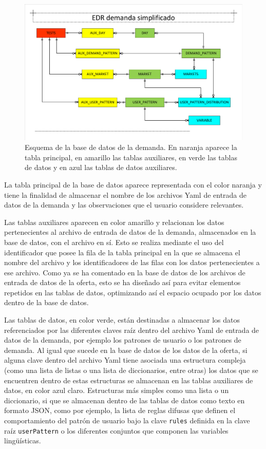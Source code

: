 \begin{figure}[H]
\centering
\includegraphics[width=.95\textwidth]{fig/Bases de datos/EDR demanda simplificado.pdf}
\caption{Esquema de la base de datos de la demanda. En naranja aparece la tabla principal, en amarillo las tablas auxiliares, en verde las tablas de datos y en azul las tablas de datos auxiliares.}
\label{fig:edrDemandaSimplificado}
\end{figure}

La tabla principal de la base de datos aparece representada con el color naranja y tiene la finalidad de almacenar el nombre de los archivos \acrshort{Yaml} de entrada de datos de la demanda y las observaciones que el usuario considere relevantes.

Las tablas auxiliares aparecen en color amarillo y relacionan los datos pertenecientes al archivo de entrada de datos de la demanda, almacenados en la base de datos, con el archivo en sí. Esto se realiza mediante el uso del identificador que posee la fila de la tabla principal en la que se almacena el nombre del archivo y los identificadores de las filas con los datos pertenecientes a ese archivo. Como ya se ha comentado en la base de datos de los archivos de entrada de datos de la oferta, esto se ha diseñado así para evitar elementos repetidos en las tablas de datos, optimizando así el espacio ocupado por los datos dentro de la base de datos.

Las tablas de datos, en color verde, están destinadas a almacenar los datos referenciados por las diferentes claves raíz dentro del archivo \acrshort{Yaml} de entrada de datos de la demanda, por ejemplo los patrones de usuario o los patrones de demanda. Al igual que sucede en la base de datos de los datos de la oferta, si alguna clave dentro del archivo \acrshort{Yaml} tiene asociada una estructura compleja (como una lista de listas o una lista de diccionarios, entre otras) los datos que se encuentren dentro de estas estructuras se almacenan en las tablas auxiliares de datos, en color azul claro. Estructuras más simples como una lista o un diccionario, si que se almacenan dentro de las tablas de datos como texto en formato \acrshort{JSON}, como por ejemplo, la lista de reglas difusas que definen el comportamiento del patrón de usuario bajo la clave \texttt{rules} definida en la clave raíz \texttt{userPattern} o los diferentes conjuntos que componen las variables lingüísticas.

